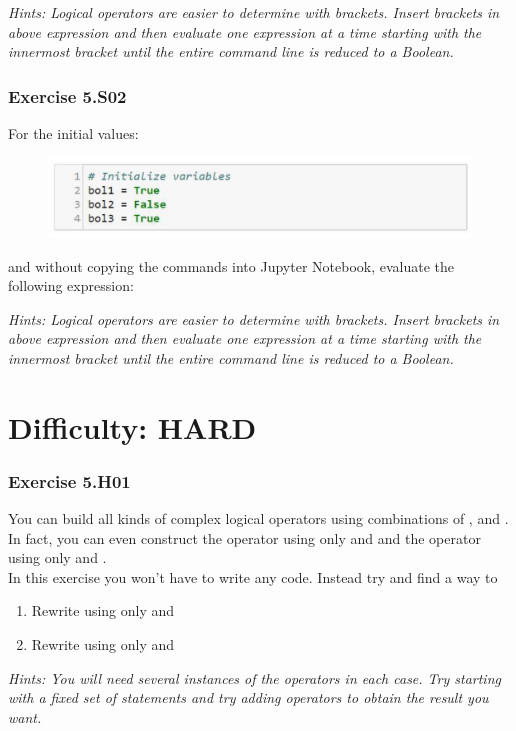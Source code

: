 \textit{Hints:
Logical operators are easier to determine with brackets. Insert brackets in above expression and then evaluate one expression at a time starting with the innermost bracket until the entire command line is reduced to a Boolean.}\\[1cm]



\subsubsection*{Exercise 5.S02}
For the initial values:
\begin{figure}[H]
		\centering
		\includegraphics[width=\textwidth]{../IMG/5S02.png} 
\end{figure}
and without copying the commands into Jupyter Notebook, evaluate the following
expression:
\begin{center}
	{}
\end{center}


\textit{Hints:
Logical operators are easier to determine with brackets. Insert brackets in above expression and then evaluate one expression at a time starting with the innermost bracket until the entire command line is reduced to a Boolean.}



\newpage
\section{Difficulty: HARD}

\subsubsection*{Exercise 5.H01}
You can build all kinds of complex logical operators using combinations of {}, {} and {}. In fact, you can even construct the {} operator using only {} and {} and the {} operator using only {} and {}.\\
In this exercise you won’t have to write any code. Instead try and find a way to
\begin{enumerate}[label=(\alph*)]
	\item Rewrite {} using only {} and {}
	\item Rewrite {} using only {} and {}
\end{enumerate}
	
\textit{Hints:
You will need several instances of the operators in each case. Try starting with a fixed set of statements and try adding operators to obtain the result you want.}
